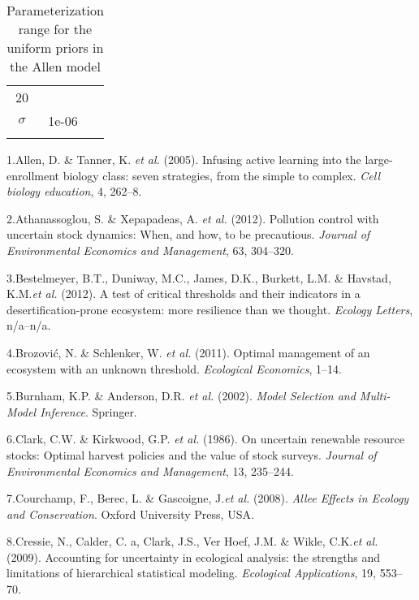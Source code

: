 \documentclass[author-year, 12pt,review]{elsarticle} %
\begin{document}
\begin{longtable}[c]{@{}ccc@{}}
\begin{minipage}[t]{0.18\columnwidth}
20
\end{minipage}
\\\addlinespace
\begin{minipage}[t]{0.15\columnwidth}\centering
$\sigma$
\end{minipage} & \begin{minipage}[t]{0.18\columnwidth}\centering
1e-06
\end{minipage} & \begin{minipage}[t]{0.18\columnwidth}\centering
100
\end{minipage}
\\\addlinespace
\bottomrule
\addlinespace
\caption{Parameterization range for the uniform priors in the Allen
model}
\end{longtable}

1.Allen, D. \& Tanner, K. \emph{et al.} (2005). Infusing active learning
into the large-enrollment biology class: seven strategies, from the
simple to complex. \emph{Cell biology education}, 4, 262--8.

2.Athanassoglou, S. \& Xepapadeas, A. \emph{et al.} (2012). Pollution
control with uncertain stock dynamics: When, and how, to be precautious.
\emph{Journal of Environmental Economics and Management}, 63, 304--320.

3.Bestelmeyer, B.T., Duniway, M.C., James, D.K., Burkett, L.M. \&
Havstad, K.M.\emph{et al.} (2012). A test of critical thresholds and
their indicators in a desertification-prone ecosystem: more resilience
than we thought. \emph{Ecology Letters}, n/a--n/a.

4.Brozović, N. \& Schlenker, W. \emph{et al.} (2011). Optimal management
of an ecosystem with an unknown threshold. \emph{Ecological Economics},
1--14.

5.Burnham, K.P. \& Anderson, D.R. \emph{et al.} (2002). \emph{Model
Selection and Multi-Model Inference}. Springer.

6.Clark, C.W. \& Kirkwood, G.P. \emph{et al.} (1986). On uncertain
renewable resource stocks: Optimal harvest policies and the value of
stock surveys. \emph{Journal of Environmental Economics and Management},
13, 235--244.

7.Courchamp, F., Berec, L. \& Gascoigne, J.\emph{et al.} (2008).
\emph{Allee Effects in Ecology and Conservation}. Oxford University
Press, USA.

8.Cressie, N., Calder, C. a, Clark, J.S., {Ver Hoef}, J.M. \& Wikle,
C.K.\emph{et al.} (2009). Accounting for uncertainty in ecological
analysis: the strengths and limitations of hierarchical statistical
modeling. \emph{Ecological Applications}, 19, 553--70.
\end{document}
